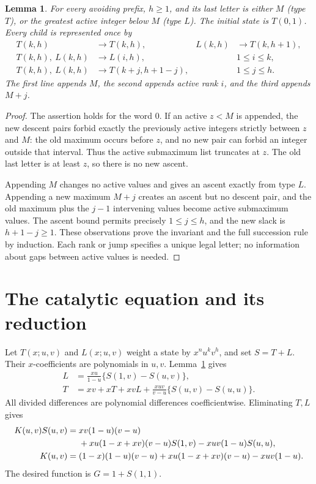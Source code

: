 \documentclass[11pt,letterpaper]{article}
\newtheorem{lemma}[theorem]{Lemma}
\theoremstyle{remark}\newtheorem{remark}[theorem]{Remark}
\begin{document}
\begin{lemma}\label{a62:lem:state}
For every avoiding prefix, $h\ge1$, and its last letter is either $M$ (type $T$), or the greatest active integer below $M$ (type $L$). The initial state is $T(0,1)$. Every child is represented once by
\begin{align*}
 T(k,h)&\longrightarrow T(k,h),& L(k,h)&\longrightarrow T(k,h+1),\\
 T(k,h),\ L(k,h)&\longrightarrow L(i,h),&&1\le i\le k,\\
 T(k,h),\ L(k,h)&\longrightarrow T(k+j,h+1-j),&&1\le j\le h.
\end{align*}
The first line appends $M$, the second appends active rank $i$, and the third appends $M+j$.
\end{lemma}
\begin{proof}
The assertion holds for the word $0$. If an active $z<M$ is appended, the new descent pairs forbid exactly the previously active integers strictly between $z$ and $M$: the old maximum occurs before $z$, and no new pair can forbid an integer outside that interval. Thus the active submaximum list truncates at $z$. The old last letter is at least $z$, so there is no new ascent.

Appending $M$ changes no active values and gives an ascent exactly from type $L$. Appending a new maximum $M+j$ creates an ascent but no descent pair, and the old maximum plus the $j-1$ intervening values become active submaximum values. The ascent bound permits precisely $1\le j\le h$, and the new slack is $h+1-j\ge1$. These observations prove the invariant and the full succession rule by induction. Each rank or jump specifies a unique legal letter; no information about gaps between active values is needed.
\end{proof}

\section{The catalytic equation and its reduction}\label{a62:sec:kernel}
Let $T(x;u,v)$ and $L(x;u,v)$ weight a state by $x^nu^kv^h$, and set $S=T+L$. Their $x$-coefficients are polynomials in $u,v$. Lemma~\ref{a62:lem:state} gives
\begin{align*}
L&=\frac{xu}{1-u}\{S(1,v)-S(u,v)\},\\
T&=xv+xT+xvL+\frac{xuv}{v-u}\{S(u,v)-S(u,u)\}.
\end{align*}
All divided differences are polynomial differences coefficientwise. Eliminating $T,L$ gives
\begin{align}\label{a62:eq:kernel}
K(u,v)S(u,v)={}&xv(1-u)(v-u)\notag\\
&+xu(1-x+xv)(v-u)S(1,v)-xuv(1-u)S(u,u),\\
K(u,v)={}&(1-x)(1-u)(v-u)+xu(1-x+xv)(v-u)-xuv(1-u).
\notag
\end{align}
The desired function is $G=1+S(1,1)$.
\end{document}
